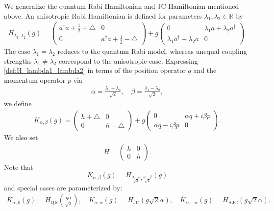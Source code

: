 \documentclass[12pt,dvipdfmx]{article}
\newcommand{\RR}{\mathbb{R}}
\begin{document}
%
%
%
We generalize the quantum Rabi Hamiltonian and JC Hamiltonian mentioned above.  
An anisotropic Rabi Hamiltonian is defined for parameters $\lambda_1, \lambda_2 \in \RR$ by
\begin{align}\label{def:H_lambda1_lambda2}
    H_{\lambda_1, \lambda_2}(g) 
    = \begin{pmatrix} 
        a^\dagger a + \frac12 + \triangle & 0 \\
        0 & a^\dagger a + \frac12 - \triangle
    \end{pmatrix} 
    + g \begin{pmatrix}
        0 & \lambda_1 a + \lambda_2 a^\dagger \\
        \lambda_1 a^\dagger + \lambda_2 a & 0
    \end{pmatrix}. 
\end{align}
The case $\lambda_1 = \lambda_2$ reduces to the quantum Rabi model, whereas unequal coupling strengths $\lambda_1 \ne \lambda_2$ correspond to the anisotropic case. Expressing \eqref{def:H_lambda1_lambda2} in terms of the position operator $q$ 
and the momentum operator $p$ via 
\begin{align*}
    \alpha = \frac{\lambda_1 + \lambda_2}{\sqrt2},
    \quad
    \beta = \frac{\lambda_1 - \lambda_2}{\sqrt2},
\end{align*}
we define
\begin{align}\label{def:K_alpha_beta}
    K_{\alpha, \beta}(g) 
= \begin{pmatrix}
        h + \triangle & 0 \\
        0 & h - \triangle
    \end{pmatrix}
    + g \begin{pmatrix}
        0 & \alpha q + i\beta p \\
        \alpha q - i\beta p & 0
    \end{pmatrix}.
\end{align}
We also set 
\begin{align}\label{hh}
    H 
    = 
    \begin{pmatrix}
        h & 0\\
        0 & h
    \end{pmatrix}. 
    \end{align}
Note that 
\[K_{\alpha, \beta}(g)= H_{\frac{\alpha + \beta}{\sqrt2}, \frac{\alpha - \beta}{\sqrt2}}(g)\] 
and 
special cases are parameterized by:
\begin{align*}
    K_{\alpha,0}(g) = H_\mathrm{QR}\left(\frac{g\alpha}{\sqrt2}\right), 
    \quad
    K_{\alpha,\alpha}(g) = H_\mathrm{JC} (g\sqrt2 \alpha), 
    \quad
    K_{\alpha,-\alpha}(g) = H_\mathrm{AJC}(g\sqrt2 \alpha).
\end{align*}
\end{document}
